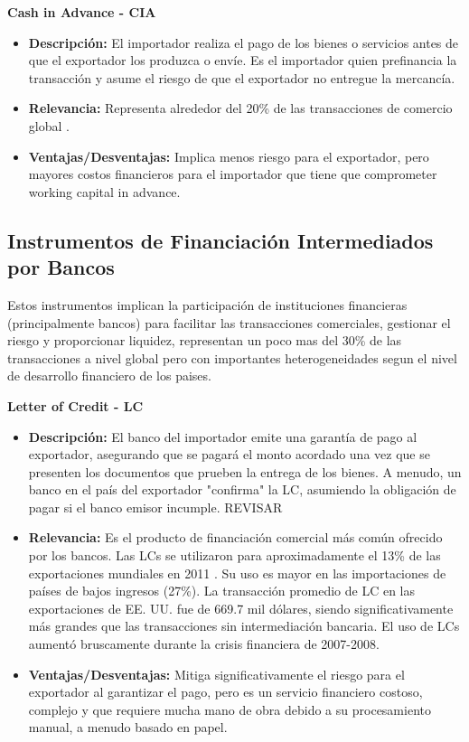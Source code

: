 \documentclass[11pt]{article}
\begin{document}
\textbf{Cash in Advance - CIA}
\begin{itemize}
\item \textbf{Descripción:} El importador realiza el pago de los bienes o servicios antes de que el exportador los produzca o envíe. Es el importador quien prefinancia la transacción y asume el riesgo de que el exportador no entregue la mercancía.
\item \textbf{Relevancia:} Representa alrededor del 20\% de las transacciones de comercio global \citet{IMF2009}. 

\item \textbf{Ventajas/Desventajas:} Implica menos riesgo para el exportador, pero mayores costos financieros para el importador que tiene que comprometer working capital in advance.
\end{itemize}

\subsection{Instrumentos de Financiación Intermediados por Bancos}

Estos instrumentos implican la participación de instituciones financieras (principalmente bancos) para facilitar las transacciones comerciales, gestionar el riesgo y proporcionar liquidez, representan un poco mas del 30\% de las transacciones a nivel global \citet{imf_2009} pero con importantes heterogeneidades segun el nivel de desarrollo financiero de los paises.

\textbf{Letter of Credit - LC}
\begin{itemize}
\item \textbf{Descripción:} El banco del importador emite una garantía de pago al exportador, asegurando que se pagará el monto acordado una vez que se presenten los documentos que prueben la entrega de los bienes. A menudo, un banco en el país del exportador "confirma" la LC, asumiendo la obligación de pagar si el banco emisor incumple. REVISAR


\item \textbf{Relevancia:} Es el producto de financiación comercial más común ofrecido por los bancos. Las LCs se utilizaron para aproximadamente el 13\% de las exportaciones mundiales en 2011 . Su uso es mayor en las importaciones de países de bajos ingresos (27\%). La transacción promedio de LC en las exportaciones de EE. UU. fue de 669.7 mil dólares, siendo significativamente más grandes que las transacciones sin intermediación bancaria. El uso de LCs aumentó bruscamente durante la crisis financiera de 2007-2008.\citet{IMF-BAFT2011}

\item \textbf{Ventajas/Desventajas:} Mitiga significativamente el riesgo para el exportador al garantizar el pago, pero es un servicio financiero costoso, complejo y que requiere mucha mano de obra debido a su procesamiento manual, a menudo basado en papel.
\end{itemize}
\end{document}
